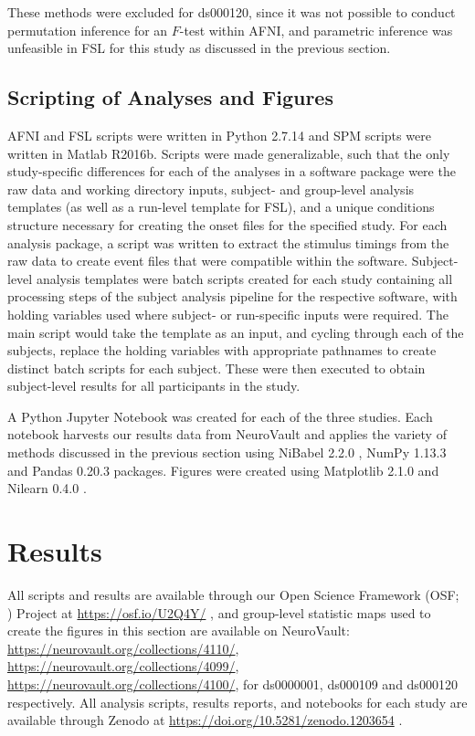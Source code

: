 These methods were excluded for ds000120, since it was not possible to conduct permutation inference for an $F$-test within AFNI, and parametric inference was unfeasible in FSL for this study as discussed in the previous section. 

\subsection{Scripting of Analyses and Figures}
AFNI and FSL scripts were written in Python 2.7.14 and SPM scripts were written in Matlab R2016b. Scripts were made generalizable, such that the only study-specific differences for each of the analyses in a software package were the raw data and working directory inputs, subject- and group-level analysis templates (as well as a run-level template for FSL), and a unique conditions structure necessary for creating the onset files for the specified study. For each analysis package, a script was written to extract the stimulus timings from the raw data to create event files that were compatible within the software. Subject-level analysis templates were batch scripts created for each study containing all processing steps of the subject analysis pipeline for the respective software, with holding variables used where subject- or run-specific inputs were required. The main script would take the template as an input, and cycling through each of the subjects, replace the holding variables with appropriate pathnames to create distinct batch scripts for each subject. These were then executed to obtain subject-level results for all participants in the study. 

A Python Jupyter Notebook \citep{Kluyver2016-yl} was created for each of the three studies. Each notebook harvests our results data from NeuroVault and applies the variety of methods discussed in the previous section using NiBabel 2.2.0 \citep{Brett2017-zb}, NumPy 1.13.3 \citep{Walt2011-db} and Pandas 0.20.3 \citep{McKinney2010-dv} packages. Figures were created using Matplotlib 2.1.0 \citep{Hunter2007-nu} and Nilearn 0.4.0 \citep{Abraham2014-ap}. 

\section{Results}

All scripts and results are available through our Open Science Framework (OSF; \citep{Erin_D_Foster2017-au}) Project at \href{https://osf.io/U2Q4Y/}{https://osf.io/U2Q4Y/} \citep{Bowring2018-wp}, and group-level statistic maps used to create the figures in this section are available on NeuroVault: \href{https://neurovault.org/collections/4110/}{https://neurovault.org/collections/4110/}, \href{https://neurovault.org/collections/4099/}{https://neurovault.org/collections/4099/}, \href{https://neurovault.org/collections/4100/}{https://neurovault.org/collections/4100/}, for ds0000001, ds000109 and ds000120 respectively. All analysis scripts, results reports, and notebooks for each study are available through Zenodo \citep{Nielsen2014-vl} at \href{https://doi.org/10.5281/zenodo.1203654}{https://doi.org/10.5281/zenodo.1203654} \citep{Bowring2018-jp}.

